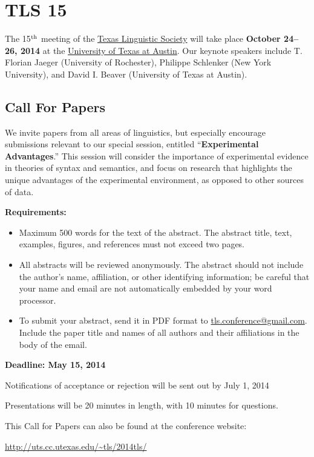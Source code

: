 \documentclass[11pt]{article}
\begin{document}
\clearpage\thispagestyle{empty}

\section*{TLS 15}

The 15$^{\rm th}$ meeting of the \href{http://uts.cc.utexas.edu/~tls}{Texas Linguistic Society} will take place \textbf{October 24--26, 2014} at the \href{https://www.utexas.edu/cola/depts/linguistics/}{University of Texas at Austin}. Our keynote speakers include T. Florian Jaeger (University of Rochester), Philippe Schlenker (New York University), and David I. Beaver (University of Texas at Austin).

\subsection*{Call For Papers}

We invite papers from all areas of linguistics, but especially encourage submissions relevant to our special session, entitled ``\textbf{Experimental Advantages}.''
This session will consider the importance of experimental evidence in theories of syntax and semantics, and focus on research that highlights the unique advantages of the experimental environment, as opposed to other sources of data.

\bigskip\noindent
\textbf{Requirements:}

\begin{itemize}
  \item Maximum 500 words for the text of the abstract. The abstract title, text, examples, figures, and references must not exceed two pages.
  \item All abstracts will be reviewed anonymously. The abstract should not include the author’s name, affiliation, or other identifying information; be careful that your name and email are not automatically embedded by your word processor.
  \item To submit your abstract, send it in PDF format to \href{mailto:tls.conference@gmail.com}{tls.conference@gmail.com}. Include the paper title and names of all authors and their affiliations in the body of the email.
\end{itemize}

\textbf{Deadline: May 15, 2014}

\bigskip\noindent
Notifications of acceptance or rejection will be sent out by July 1, 2014

\medskip\noindent
Presentations will be 20 minutes in length, with 10 minutes for questions.

\medskip\noindent
This Call for Papers can also be found at the conference website:

\medskip
\url{http://uts.cc.utexas.edu/~tls/2014tls/}
\end{document}
